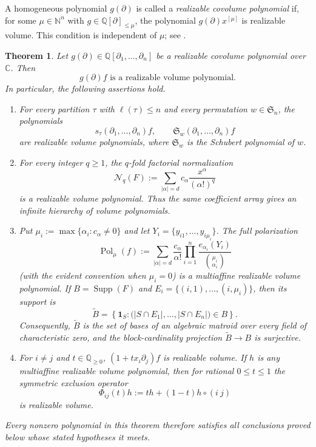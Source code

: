 \documentclass[11pt,a4paper,oneside]{amsart}
\numberwithin{equation}{section}
\newtheorem{theorem}{Theorem}[section]
\theoremstyle{definition}
\theoremstyle{remark}
\DeclareMathOperator{\Supp}{Supp}
\newcommand{\N}{\mathbb N}
\newcommand{\Q}{\mathbb Q}
\newcommand{\C}{\mathbb C}
\newcommand{\cN}{\mathcal N}
\begin{document}
A homogeneous polynomial $g(\partial)$ is called a \emph{realizable covolume
polynomial} if, for some $\mu\in\N^n$ with
$g\in\Q[\partial]_{\leq\mu}$, the polynomial
$g(\partial)x^{[\mu]}$ is realizable volume.  This condition is independent of
$\mu$; see \cite[Definition~1.2]{GHMSW25}.

\begin{theorem}
\label{thm:operator-descendants}
Let $g(\partial)\in\Q[\partial_1,\ldots,\partial_n]$ be a realizable
covolume polynomial over $\C$.  Then
\begin{equation}\label{eq:covolume-descendant}
 g(\partial)f\text{ is a realizable volume polynomial}.
\end{equation}
In particular, the following assertions hold.
\begin{enumerate}[label=\textup{(\roman*)}]
\item For every partition $\tau$ with $\ell(\tau)\leq n$ and every permutation $w\in\mathfrak S_n$, the polynomials
\[
 s_\tau(\partial_1,\ldots,\partial_n)f,
 \qquad
 \mathfrak S_w(\partial_1,\ldots,\partial_n)f
\]
are realizable volume polynomials, where $\mathfrak S_w$ is the Schubert polynomial of $w$.
\item For every integer $q\geq1$, the $q$-fold factorial normalization
\begin{equation}\label{eq:iterated-factorial-normalization}
 \cN_q(F):=\sum_{|\alpha|=d}c_\alpha
       \frac{x^\alpha}{(\alpha!)^q}
\end{equation}
is a realizable volume polynomial.  Thus the same coefficient array gives an
infinite hierarchy of volume polynomials.
\item Put $\mu_i:=\max\{\alpha_i:c_\alpha\neq0\}$ and let
$Y_i=\{y_{i1},\ldots,y_{i\mu_i}\}$.  The full polarization
\begin{equation}\label{eq:full-polarization}
 \operatorname{Pol}_\mu(f)
 :=\sum_{|\alpha|=d}\frac{c_\alpha}{\alpha!}
   \prod_{i=1}^n
   \frac{e_{\alpha_i}(Y_i)}{\binom{\mu_i}{\alpha_i}}
\end{equation}
(with the evident convention when $\mu_i=0$) is a multiaffine realizable
volume polynomial.  If $B=\Supp(F)$ and
$E_i=\{(i,1),\ldots,(i,\mu_i)\}$, then its support is
\begin{equation}\label{eq:polarized-support}
 \widetilde B
 =\left\{\mathbf 1_S:
   \bigl(|S\cap E_1|,\ldots,|S\cap E_n|\bigr)\in B\right\}.
\end{equation}
Consequently, $\widetilde B$ is the set of bases of an algebraic matroid over
every field of characteristic zero, and the block-cardinality projection
$\widetilde B\to B$ is surjective.
\item For $i\neq j$ and $t\in\Q_{\geq0}$,
$(1+t x_i\partial_j)f$ is realizable volume.  If $h$ is any multiaffine
realizable volume polynomial, then for rational $0\leq t\leq1$ the symmetric
exclusion operator
\[
 \Phi_{ij}(t)h
 :=t h+(1-t)h\circ(i\ j)
\]
is realizable volume.
\end{enumerate}
Every nonzero polynomial in this theorem therefore satisfies all conclusions
proved below whose stated hypotheses it meets.
\end{theorem}
\end{document}
